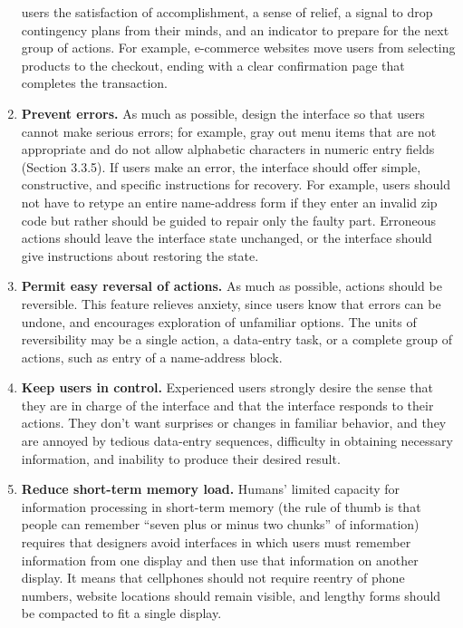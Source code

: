 \documentclass[
  12pt,
  ngerman,
  a4paper,
]{article}
\begin{document}
\begin{enumerate}
  users the satisfaction of accomplishment, a sense of relief, a signal
  to drop contingency plans from their minds, and an indicator to
  prepare for the next group of actions. For example, e-commerce
  websites move users from selecting products to the checkout, ending
  with a clear confirmation page that completes the transaction.
\item
  \textbf{Prevent errors.} As much as possible, design the interface so
  that users cannot make serious errors; for example, gray out menu
  items that are not appropriate and do not allow alphabetic characters
  in numeric entry fields (Section 3.3.5). If users make an error, the
  interface should offer simple, constructive, and specific instructions
  for recovery. For example, users should not have to retype an entire
  name-address form if they enter an invalid zip code but rather should
  be guided to repair only the faulty part. Erroneous actions should
  leave the interface state unchanged, or the interface should give
  instructions about restoring the state.
\item
  \textbf{Permit easy reversal of actions.} As much as possible, actions
  should be reversible. This feature relieves anxiety, since users know
  that errors can be undone, and encourages exploration of unfamiliar
  options. The units of reversibility may be a single action, a
  data-entry task, or a complete group of actions, such as entry of a
  name-address block.
\item
  \textbf{Keep users in control.} Experienced users strongly desire the
  sense that they are in charge of the interface and that the interface
  responds to their actions. They don't want surprises or changes in
  familiar behavior, and they are annoyed by tedious data-entry
  sequences, difficulty in obtaining necessary information, and
  inability to produce their desired result.
\item
  \textbf{Reduce short-term memory load.} Humans' limited capacity for
  information processing in short-term memory (the rule of thumb is that
  people can remember ``seven plus or minus two chunks'' of information)
  requires that designers avoid interfaces in which users must remember
  information from one display and then use that information on another
  display. It means that cellphones should not require reentry of phone
  numbers, website locations should remain visible, and lengthy forms
  should be compacted to fit a single display.
\end{enumerate}
\end{document}
